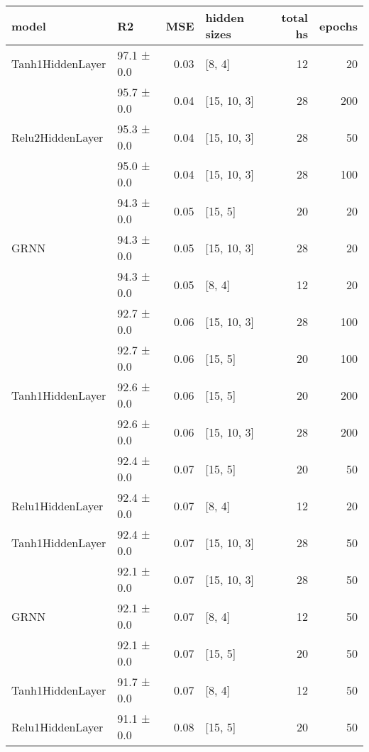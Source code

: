 
    \begin{table*}[h]
        \centering
        \begin{tabular}{llrlrr}
\hline
 model   & R2         &   MSE & hidden sizes   &   total hs &   epochs \\
\hline
 \hline
Tanh1HiddenLayer         & 97.1 ± 0.0 &  0.03 & [8, 4]         &         12 &       20 \\
 \hline
\multirow{3}{*}{Relu2HiddenLayer}         & 95.7 ± 0.0 &  0.04 & [15, 10, 3]    &         28 &      200 \\
         & 95.3 ± 0.0 &  0.04 & [15, 10, 3]    &         28 &       50 \\
         & 95.0 ± 0.0 &  0.04 & [15, 10, 3]    &         28 &      100 \\
 \hline
\multirow{3}{*}{GRNN}         & 94.3 ± 0.0 &  0.05 & [15, 5]        &         20 &       20 \\
         & 94.3 ± 0.0 &  0.05 & [15, 10, 3]    &         28 &       20 \\
         & 94.3 ± 0.0 &  0.05 & [8, 4]         &         12 &       20 \\
 \hline
\multirow{5}{*}{Tanh1HiddenLayer}         & 92.7 ± 0.0 &  0.06 & [15, 10, 3]    &         28 &      100 \\
         & 92.7 ± 0.0 &  0.06 & [15, 5]        &         20 &      100 \\
         & 92.6 ± 0.0 &  0.06 & [15, 5]        &         20 &      200 \\
         & 92.6 ± 0.0 &  0.06 & [15, 10, 3]    &         28 &      200 \\
         & 92.4 ± 0.0 &  0.07 & [15, 5]        &         20 &       50 \\
 \hline
Relu1HiddenLayer         & 92.4 ± 0.0 &  0.07 & [8, 4]         &         12 &       20 \\
 \hline
Tanh1HiddenLayer         & 92.4 ± 0.0 &  0.07 & [15, 10, 3]    &         28 &       50 \\
 \hline
\multirow{3}{*}{GRNN}         & 92.1 ± 0.0 &  0.07 & [15, 10, 3]    &         28 &       50 \\
         & 92.1 ± 0.0 &  0.07 & [8, 4]         &         12 &       50 \\
         & 92.1 ± 0.0 &  0.07 & [15, 5]        &         20 &       50 \\
 \hline
Tanh1HiddenLayer         & 91.7 ± 0.0 &  0.07 & [8, 4]         &         12 &       50 \\
 \hline
\multirow{2}{*}{Relu1HiddenLayer}         & 91.1 ± 0.0 &  0.08 & [15, 5]        &         20 &       50 \\

\end{tabular}
\end{table*}
